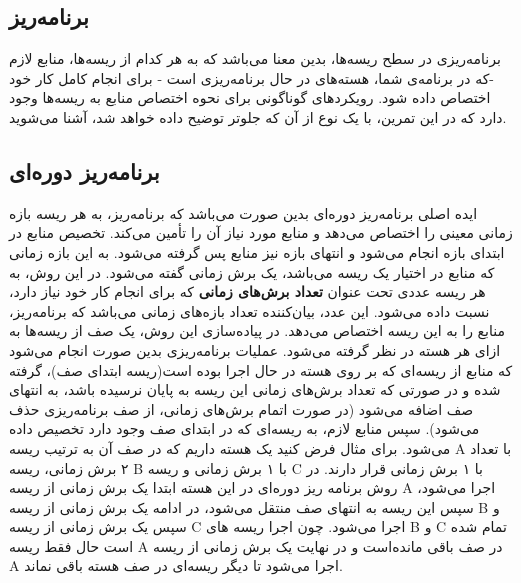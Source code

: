 \documentclass{utap}
\begin{document}
    
    	\subsection{برنامه‌ریز\protect{}} %
    	\hspace{5mm}
    برنامه‌ریزی در سطح ریسه‌‌ها، بدین معنا می‌باشد که به هر کدام از ریسه‌ها، منابع لازم -که در برنامه‌ی شما، هسته‌های در حال برنامه‌ریزی است - برای انجام کامل کار خود اختصاص داده شود. رویکردهای گوناگونی برای نحوه اختصاص منابع به ریسه‌ها وجود دارد که در این تمرین، با یک نوع از آن که جلوتر توضیح داده خواهد شد، آشنا می‌شوید.
    	\subsection{برنامه‌ریز دوره‌ای} %
    	\hspace{5mm}
    	ایده اصلی برنامه‌ریز دوره‌ای  بدین صورت می‌باشد که برنامه‌ریز، به هر ریسه بازه زمانی معینی را اختصاص می‌دهد و منابع مورد نیاز آن را تأمین می‌کند. تخصیص منابع در ابتدای بازه انجام می‌شود و انتهای بازه نیز منابع پس گرفته می‌شود. به این بازه زمانی که منابع در اختیار یک ریسه می‌باشد، یک برش زمانی گفته می‌شود.
    	در این روش، به هر ریسه عددی تحت عنوان \textbf{تعداد برش‌های زمانی} که برای انجام کار خود نیاز دارد، نسبت داده می‌شود. این عدد، بیان‌‌کننده تعداد بازه‌های زمانی می‌باشد که برنامه‌ریز، منابع را به این ریسه اختصاص می‌دهد.
    	در پیاده‌سازی این روش، یک صف از ریسه‌‌ها به ازای هر هسته در نظر گرفته می‌شود. عملیات برنامه‌ریزی بدین صورت انجام می‌شود که منابع از ریسه‌ای که بر روی هسته در حال اجرا بوده است(ریسه ابتدای صف)، گرفته شده و در صورتی که تعداد برش‌های زمانی این ریسه به پایان نرسیده باشد، به انتهای صف اضافه می‌شود (در صورت اتمام برش‌های زمانی، از صف برنامه‌ریزی حذف می‌شود). سپس منابع لازم، به ریسه‌ای که در ابتدای صف وجود دارد تخصیص داده می‌شود.
    	\newline
    	برای مثال فرض کنید یک هسته داریم که در صف آن به ترتیب ریسه‌ A با تعداد ۲ برش زمانی، ریسه‌ B با ۱ برش زمانی و ریسه C با ۱ برش زمانی قرار دارند. در روش برنامه‌ ریز دوره‌ای در این هسته ابتدا یک برش زمانی از ریسه A اجرا می‌شود، سپس این ریسه به انتها‌ی صف منتقل می‌شود، در ادامه یک برش زمانی از ریسه  ‌B و سپس یک برش زمانی از ریسه C اجرا می‌شود. چون اجرا ریسه های B و C تمام شده است حال فقط ریسه A در صف باقی مانده‌است و در نهایت یک برش زمانی از ریسه A اجرا می‌شود تا دیگر ریسه‌ای در صف هسته باقی‌ نماند.
    	
\end{document}
